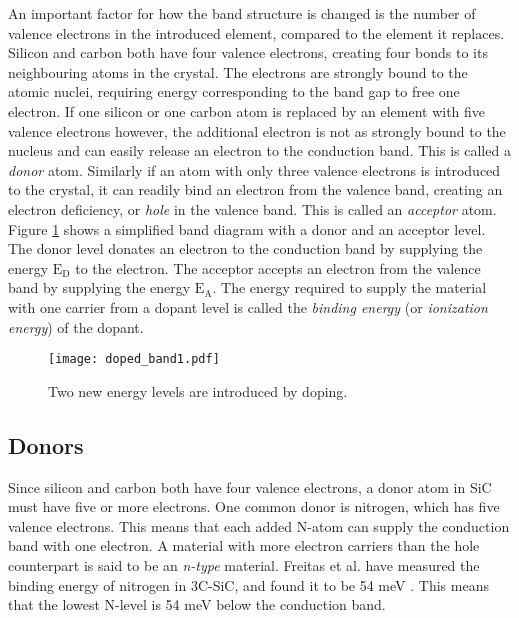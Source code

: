 An important factor for how the band structure is changed is the number of valence electrons in the introduced element, compared to the element it replaces. Silicon and carbon both have four valence electrons, creating four bonds to its neighbouring atoms in the crystal. The electrons are strongly bound to the atomic nuclei, requiring energy corresponding to the band gap to free one electron. If one silicon or one carbon atom is replaced by an element with five valence electrons however, the additional electron is not as strongly bound to the nucleus and can easily release an electron to the conduction band. This is called a \emph{donor} atom. Similarly if an atom with only three valence electrons is introduced to the crystal, it can readily bind an electron from the valence band, creating an electron deficiency, or \emph{hole} in the valence band. This is called an \emph{acceptor} atom. Figure \ref{fig:dopant_band} shows a simplified band diagram with a donor and an acceptor level. The donor level donates an electron to the conduction band by supplying the energy $\mathrm{E_D}$ to the electron. The acceptor accepts an electron from the valence band by supplying the energy $\mathrm{E_A}$. The energy required to supply the material with one carrier from a dopant level is called the \emph{binding energy} (or \emph{ionization energy}) of the dopant. 

\begin{figure}[h]
\begin{center}
\texttt{[image: doped\_band1.pdf]}
\caption{Two new energy levels are introduced by doping. 
\label{fig:dopant_band}}
\end{center}
\end{figure}

\subsection{Donors}
Since silicon and carbon both have four valence electrons, a donor atom in SiC must have five or more electrons. One common donor is nitrogen, which has five valence electrons. This means that each added N-atom can supply the conduction band with one electron. A material with more electron carriers than the hole counterpart is said to be an \emph{n-type} material. Freitas et al. have measured the binding energy of nitrogen in 3C-SiC, and found it to be 54 meV \cite{Freitas1988}. This means that the lowest N-level is 54 meV below the conduction band. 

